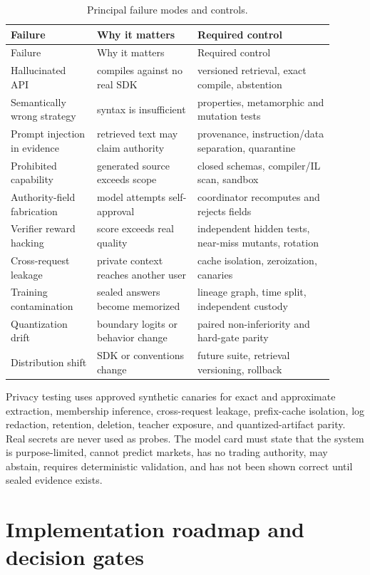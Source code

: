 \documentclass[10pt,letterpaper]{article}
\newcommand{\1}{\mathbb{1}}
\begin{document}
\begin{longtable}{L{0.24\linewidth}L{0.28\linewidth}L{0.38\linewidth}}
\caption{Principal failure modes and controls.}\label{tab:failures}\\
\toprule Failure & Why it matters & Required control \\
\midrule
\endfirsthead
\toprule Failure & Why it matters & Required control \\
\midrule
Hallucinated API & compiles against no real SDK & versioned retrieval, exact compile, abstention \\
Semantically wrong strategy & syntax is insufficient & properties, metamorphic and mutation tests \\
Prompt injection in evidence & retrieved text may claim authority & provenance, instruction/data separation, quarantine \\
Prohibited capability & generated source exceeds scope & closed schemas, compiler/IL scan, sandbox \\
Authority-field fabrication & model attempts self-approval & coordinator recomputes and rejects fields \\
Verifier reward hacking & score exceeds real quality & independent hidden tests, near-miss mutants, rotation \\
Cross-request leakage & private context reaches another user & cache isolation, zeroization, canaries \\
Training contamination & sealed answers become memorized & lineage graph, time split, independent custody \\
Quantization drift & boundary logits or behavior change & paired non-inferiority and hard-gate parity \\
Distribution shift & SDK or conventions change & future suite, retrieval versioning, rollback \\
\bottomrule
\end{longtable}

Privacy testing uses approved synthetic canaries for exact and approximate extraction, membership
inference, cross-request leakage, prefix-cache isolation, log redaction, retention, deletion, teacher
exposure, and quantized-artifact parity.  Real secrets are never used as probes.  The model card must
state that the system is purpose-limited, cannot predict markets, has no trading authority, may
abstain, requires deterministic validation, and has not been shown correct until sealed evidence
exists.

\section{Implementation roadmap and decision gates}
\end{document}
